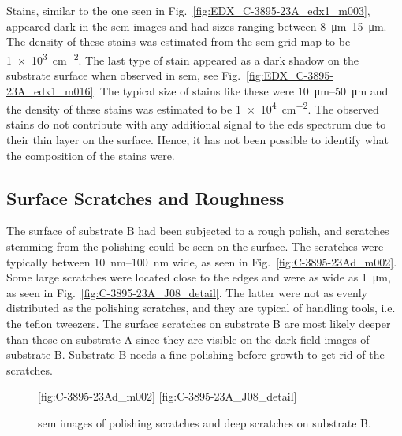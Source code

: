 Stains, similar to the one seen in Fig.~\ref{fig:EDX_C-3895-23A_edx1_m003}, appeared dark in the \ac{sem} images and had sizes ranging between \SIrange{8}{15}{\micro\metre}. The density of these stains was estimated from the \ac{sem} grid map to be \SI{1e3}{\centi\metre^{-2}}. The last type of stain appeared as a dark shadow on the substrate surface when observed in \ac{sem}, see Fig.~\ref{fig:EDX_C-3895-23A_edx1_m016}. The typical size of stains like these were \SIrange{10}{50}{\micro\metre} and the density of these stains was estimated to be \SI{1e4}{\centi\metre^{-2}}. The observed stains do not contribute with any additional signal to the \ac{eds} spectrum due to their thin layer on the surface. Hence, it has not been possible to identify what the composition of the stains were. 

\subsection{Surface Scratches and Roughness}
The surface of substrate B had been subjected to a rough polish, and scratches stemming from the polishing could be seen on the surface. The scratches were typically between \SIrange{10}{100}{\nano\metre} wide, as seen in Fig.~\ref{fig:C-3895-23Ad_m002}. Some large scratches were located close to the edges and were as wide as \SI{1}{\micro\metre}, as seen in Fig.~\ref{fig:C-3895-23A_J08_detail}. The latter were not as evenly distributed as the polishing scratches, and they are typical of handling tools, i.e. the teflon tweezers. The surface scratches on substrate B are most likely deeper than those on substrate A since they are visible on the dark field images of substrate B. Substrate B needs a fine polishing before growth to get rid of the scratches.
\begin{figure}[htbp]
    \centering
    [fig:C-3895-23Ad_m002]
    [fig:C-3895-23A_J08_detail]
    \caption[\Ac{sem} images of scratches on substrate B.]{\Ac{sem} images of  polishing scratches and  deep scratches on substrate B.}
    \label{fig:SEM_C389523_scratches}
\end{figure}

